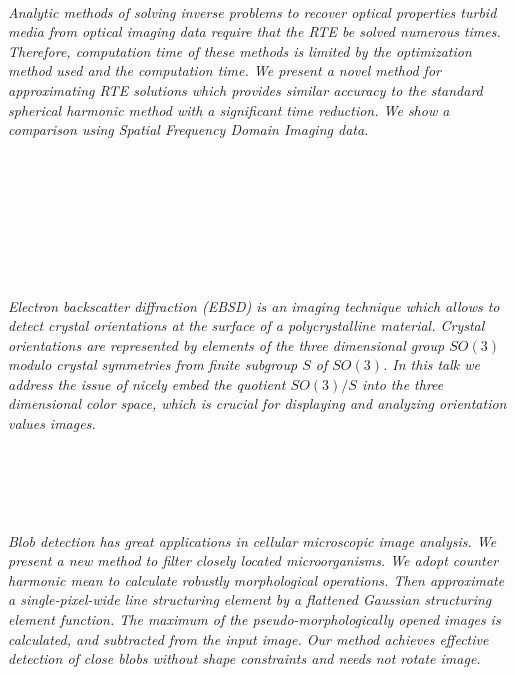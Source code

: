 \begin{multicols}{2}
\\
      \textit{Analytic methods of solving inverse problems to recover optical properties turbid media from optical imaging data require that the RTE be solved numerous times.  Therefore, computation time of these methods is limited by the optimization method used and the computation time.  We present a novel method for approximating RTE solutions which provides similar accuracy to the standard spherical harmonic method with a significant time reduction.  We show a comparison using Spatial Frequency Domain Imaging data.}\\
\\ 
        \\
        \\\\
        \\
        \\\\
\\
      \textit{Electron backscatter diffraction (EBSD) is an imaging technique which allows to detect crystal orientations at the surface of a polycrystalline material. Crystal orientations are represented by elements of the three dimensional group $SO(3)$ modulo crystal symmetries from finite subgroup $S$ of $SO(3)$. In this talk we address the issue of nicely embed the quotient $SO(3)/S$ into the three dimensional color space, which is crucial for displaying and analyzing orientation values images.}\\
\\ 
        \\
        \\\\
\\
      \textit{Blob detection has great applications in cellular microscopic image analysis. We present a new method to filter closely located microorganisms. We adopt counter harmonic mean to calculate robustly morphological operations. Then approximate a single-pixel-wide line structuring element by a flattened Gaussian structuring element function. The maximum of the pseudo-morphologically opened images is calculated, and subtracted from the input image. Our method achieves effective detection of close blobs without shape constraints and needs not rotate image.}\\
\\ 
        \\

\end{multicols}
